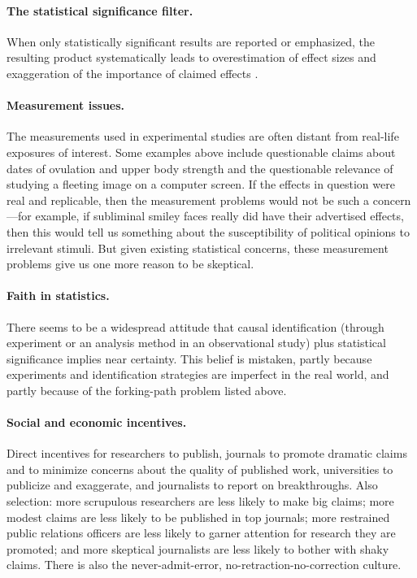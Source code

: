 \documentclass[11pt,letterpaper]{article}
\begin{document}
\paragraph{The statistical significance filter.} When only statistically
significant results are reported or emphasized, the resulting product
systematically leads to overestimation of effect sizes and exaggeration of the
importance of claimed effects \citep*[e.g.,][]{gerber2008}.

\paragraph{Measurement issues.} The measurements used in experimental studies are
often distant from real-life exposures of interest. Some examples above include
questionable claims about dates of ovulation and upper body strength and the
questionable relevance of studying a fleeting image on a computer screen. If the
effects in question were real and replicable, then the measurement problems
would not be such a concern---for example, if subliminal smiley faces really did
have their advertised effects, then this would tell us something about the
susceptibility of political opinions to irrelevant stimuli. But given existing
statistical concerns, these measurement problems give us one more reason to be
skeptical.

\paragraph{Faith in statistics.} There seems to be a widespread attitude that
causal identification (through experiment or an analysis method in an
observational study) plus statistical significance implies near certainty. This
belief is mistaken, partly because experiments and identification strategies
are imperfect in the real world, and partly because of the forking-path problem
listed above.

\paragraph{Social and economic incentives.} Direct incentives for researchers to
publish, journals to promote dramatic claims and to minimize concerns about the
quality of published work, universities to publicize and exaggerate, and
journalists to report on breakthroughs. Also selection: more scrupulous
researchers are less likely to make big claims; more modest claims are less
likely to be published in top journals; more restrained public relations
officers are less likely to garner attention for research they are promoted; and
more skeptical journalists are less likely to bother with shaky claims. There is
also the never-admit-error, no-retraction-no-correction culture.
\end{document}
